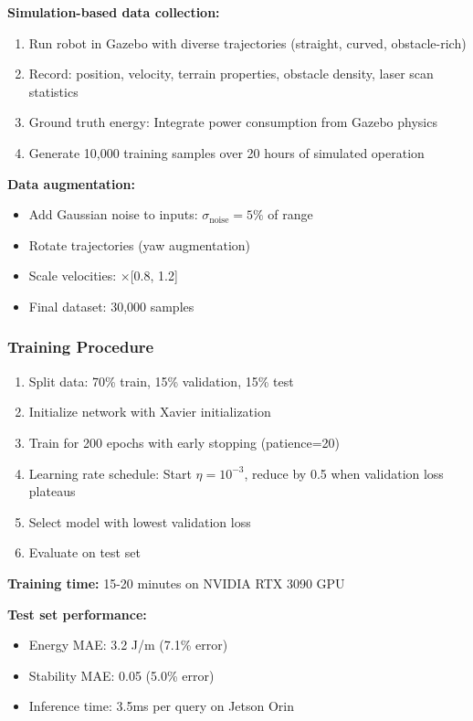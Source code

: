 \textbf{Simulation-based data collection:}
\begin{enumerate}
    \item Run robot in Gazebo with diverse trajectories (straight, curved, obstacle-rich)
    \item Record: position, velocity, terrain properties, obstacle density, laser scan statistics
    \item Ground truth energy: Integrate power consumption from Gazebo physics
    \item Generate 10,000 training samples over 20 hours of simulated operation
\end{enumerate}

\textbf{Data augmentation:}
\begin{itemize}
    \item Add Gaussian noise to inputs: $\sigma_{\text{noise}} = 5\%$ of range
    \item Rotate trajectories (yaw augmentation)
    \item Scale velocities: $\times$[0.8, 1.2]
    \item Final dataset: 30,000 samples
\end{itemize}

\subsubsection{Training Procedure}

\begin{enumerate}
    \item Split data: 70\% train, 15\% validation, 15\% test
    \item Initialize network with Xavier initialization
    \item Train for 200 epochs with early stopping (patience=20)
    \item Learning rate schedule: Start $\eta = 10^{-3}$, reduce by 0.5 when validation loss plateaus
    \item Select model with lowest validation loss
    \item Evaluate on test set
\end{enumerate}

\textbf{Training time:} 15-20 minutes on NVIDIA RTX 3090 GPU

\textbf{Test set performance:}
\begin{itemize}
    \item Energy MAE: 3.2 J/m (7.1\% error)
    \item Stability MAE: 0.05 (5.0\% error)
    \item Inference time: 3.5ms per query on Jetson Orin
\end{itemize}

